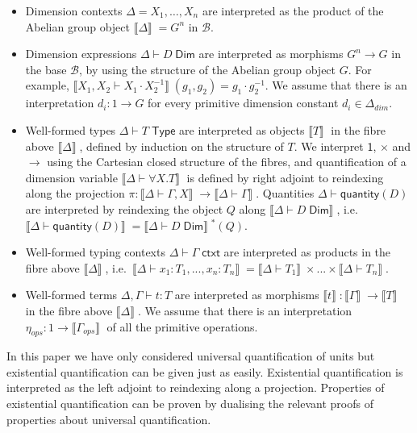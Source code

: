 \documentclass[a4paper,UKenglish]{lipics}
\newcommand{\ra}{\rightarrow}
\newcommand{\msf}[1]{\mathsf{#1}} %
\newcommand{\B}{\mathcal{B}}
\newcommand{\sem}[1]{\ensuremath{\llbracket #1 \rrbracket} \;}
\newcommand{\unitTy}{\msf{1}}
\newcommand{\qnt}{\msf{quantity}}
\newcommand{\Deltadim}{\ensuremath{\Delta_{dim}}}
\newcommand{\Gammaops}{\ensuremath{\Gamma_{ops}}}
\newcommand{\etaops}{\ensuremath{\eta_{ops}}}
\newcommand{\Dj}[2]{#1 \vdash #2 \; \msf{ Dim}}
\begin{document}
\begin{itemize}
\item Dimension contexts $\Delta = X_1, \ldots, X_n$ are interpreted as the product of the Abelian group object $\sem{\Delta} = G^n$ in $\B$.
\item Dimension expressions $\Dj \Delta D$ are interpreted as morphisms $G^n \ra G$ in the base $\B$, by using the structure of the Abelian group object $G$. For example, $\sem{X_1, X_2 \vdash X_1 \cdot X_2^{-1}}(g_1,g_2) = g_1 \cdot g_2^{-1}$. We assume that there is an interpretation $d_i : 1 \to G$ for every primitive dimension constant $d_i \in \Deltadim$.

\item Well-formed types $\Delta \vdash T \; \msf{ Type}$ are interpreted as objects $\sem{T}$ in the fibre above $\sem{\Delta}$,  defined by induction on the structure of $T$. We interpret $\unitTy$, $\times$ and $\rightarrow$ using the Cartesian closed structure of the fibres, and quantification of a dimension variable $\sem{\Delta \vdash \forall X. T}$ is defined by right adjoint to reindexing along the projection $\pi: \sem{\Delta \vdash \Gamma, X} \rightarrow \sem{\Delta \vdash \Gamma}$. Quantities $\Delta \vdash \qnt(D)$ are interpreted by reindexing the object $Q$ along $\sem{\Dj \Delta D}$, i.e. $\sem{\Delta \vdash \qnt(D)} = \sem{\Dj \Delta D}^\ast (Q)$.

\item Well-formed typing contexts $\Delta \vdash \Gamma \; \msf{ ctxt}$ are interpreted as products in the fibre above $\sem{\Delta}$, i.e.\ $\sem{\Delta \vdash x_1 : T_1 ,..., x_n:T_n} = \sem{\Delta \vdash T_1} \times ... \times \sem{\Delta \vdash T_n}$.

\item Well-formed terms $\Delta, \Gamma \vdash t : T$ are interpreted as morphisms $\sem{t} : \sem{\Gamma} \ra \sem{T}$ in the fibre above $\sem{\Delta}$. We assume that there is an interpretation $\etaops : 1 \to \sem{\Gammaops}$ of all the primitive operations.
\end{itemize}

In this paper we have only considered universal quantification of units but existential quantification can be given just as easily. Existential quantification is interpreted as the left adjoint to reindexing along a projection. Properties of  existential quantification can be proven by dualising the relevant proofs of properties about universal quantification.
\end{document}
